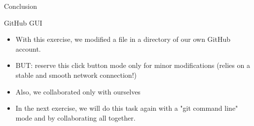 
%





\begin{frame}{ Conclusion}
\begin{exampleblock}{GitHub GUI}
\begin{itemize}
    \item With this exercise, we modified a file in a directory of our own GitHub account. 
    \item BUT: reserve this click button mode only for minor modifications (relies on a stable and smooth network connection!)
    \item Also, we collaborated only with ourselves
    \item In the next exercise, we will do this task again with a "git command line" mode and by collaborating all together.
\end{itemize}
\end{exampleblock}
\end{frame}


